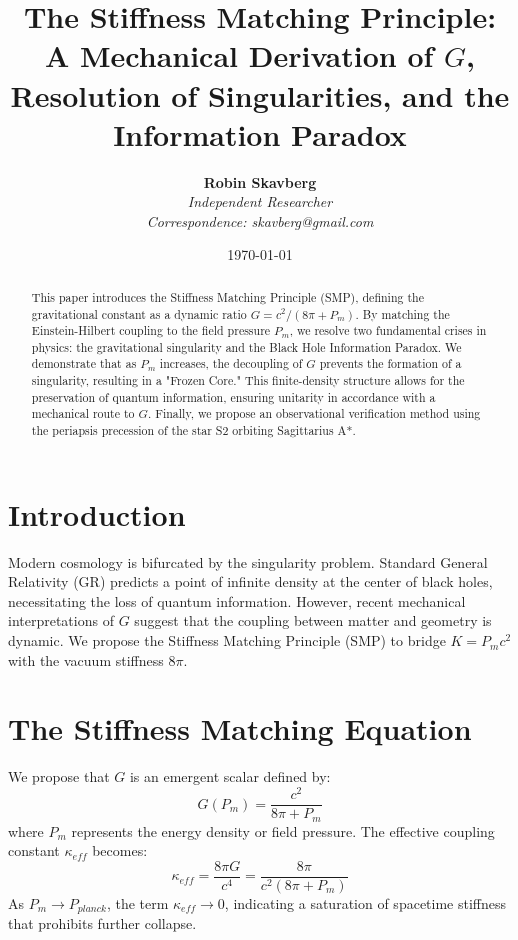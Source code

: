 \documentclass[11pt,letterpaper]{article}
\title{\textbf{The Stiffness Matching Principle: A Mechanical Derivation of $G$, Resolution of Singularities, and the Information Paradox}}
\author{\textbf{Robin Skavberg} \\ \small \textit{Independent Researcher} \\ \small \textit{Correspondence: skavberg@gmail.com}}
\date{\today}
\begin{document}
\maketitle

\begin{abstract}
This paper introduces the Stiffness Matching Principle (SMP), defining the gravitational constant as a dynamic ratio $G = c^2 / (8\pi + P_m)$. By matching the Einstein-Hilbert coupling to the field pressure $P_m$, we resolve two fundamental crises in physics: the gravitational singularity and the Black Hole Information Paradox. We demonstrate that as $P_m$ increases, the decoupling of $G$ prevents the formation of a singularity, resulting in a "Frozen Core." This finite-density structure allows for the preservation of quantum information, ensuring unitarity in accordance with a mechanical route to $G$. Finally, we propose an observational verification method using the periapsis precession of the star S2 orbiting Sagittarius A*.
\end{abstract}

\section{Introduction}
Modern cosmology is bifurcated by the singularity problem. Standard General Relativity (GR) predicts a point of infinite density at the center of black holes, necessitating the loss of quantum information. However, recent mechanical interpretations of $G$ \cite{Zenodo18393277} suggest that the coupling between matter and geometry is dynamic. We propose the Stiffness Matching Principle (SMP) to bridge $K = P_m c^2$ with the vacuum stiffness $8\pi$.

\section{The Stiffness Matching Equation}
We propose that $G$ is an emergent scalar defined by:
\begin{equation}
G(P_m) = \frac{c^2}{8\pi + P_m}
\end{equation}
where $P_m$ represents the energy density or field pressure. The effective coupling constant $\kappa_{eff}$ becomes:
\begin{equation}
\kappa_{eff} = \frac{8\pi G}{c^4} = \frac{8\pi}{c^2(8\pi + P_m)}
\end{equation}
As $P_m \to P_{planck}$, the term $\kappa_{eff} \to 0$, indicating a saturation of spacetime stiffness that prohibits further collapse.
\end{document}
